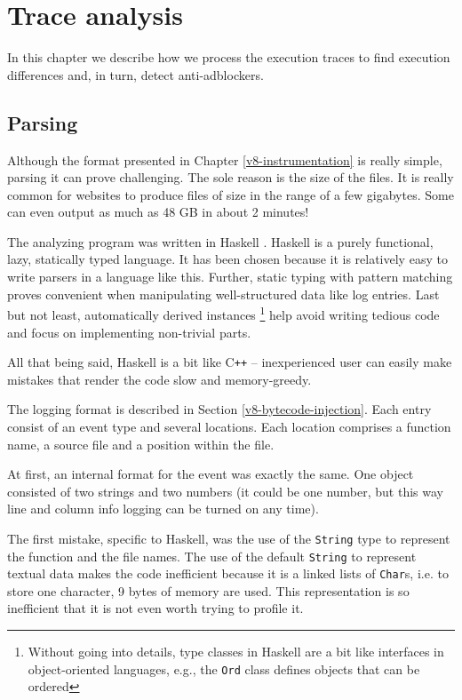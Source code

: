 \chapter{Trace analysis}

In this chapter we describe how we process the execution traces to find execution differences
and, in turn, detect anti-adblockers.

\section{Parsing}
Although the format presented in Chapter \ref{v8-instrumentation} is really simple, parsing it can prove challenging.
The sole reason is the size of the files. It is really common for websites to produce files of size in the range of a few gigabytes.
Some can even output as much as 48 GB in about 2 minutes!

The analyzing program was written in Haskell \cite{haskell:main-page}.
Haskell is a purely functional, lazy, statically typed language.
It has been chosen because it is relatively easy to write parsers in a language like this.
Further, static typing with pattern matching proves convenient when manipulating well-structured data like log entries.
Last but not least, automatically derived instances
\footnote{Without going into details, type classes in Haskell are a bit like interfaces in 
object-oriented languages, e.g., the \texttt{Ord} class defines objects that can be ordered}
help avoid writing tedious code and focus on implementing non-trivial parts.

All that being said, Haskell is a bit like C\texttt{++} -- inexperienced user can easily make mistakes
that render the code slow and memory-greedy.

The logging format is described in Section \ref{v8-bytecode-injection}.
Each entry consist of an event type and several locations. Each location comprises
a function name, a source file and a position within the file.

At first, an internal format for the event was exactly the same. One object consisted of
two strings and two numbers (it could be one number, but this way line and column info
logging can be turned on any time).

The first mistake, specific to Haskell, was the use of the \texttt{String} type to represent the function and the file
names. The use of the default \texttt{String} to represent textual data makes the code inefficient 
because it is a linked lists of \texttt{Char}s, i.e. to store one character, 9 bytes of memory are used.
This representation is so inefficient that it is not even worth trying to profile it.


